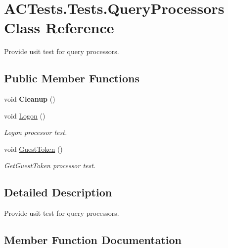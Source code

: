 \hypertarget{class_a_c_tests_1_1_tests_1_1_query_processors}{}\section{A\+C\+Tests.\+Tests.\+Query\+Processors Class Reference}
\label{class_a_c_tests_1_1_tests_1_1_query_processors}


Provide usit test for query processors.  


\subsection*{Public Member Functions}
\begin{DoxyCompactItemize}
\item 
\mbox{\label{class_a_c_tests_1_1_tests_1_1_query_processors_afd4b62ef2a0fdfc623f2102fec22e650}} 
void {\bfseries Cleanup} ()
\item 
void \mbox{\hyperlink{class_a_c_tests_1_1_tests_1_1_query_processors_a52c322106f55712f33a2e1c1273008ad}{Logon}} ()
\begin{DoxyCompactList}\small\item\em Logon processor test. \end{DoxyCompactList}\item 
void \mbox{\hyperlink{class_a_c_tests_1_1_tests_1_1_query_processors_ae80608cafaf625d07d6a27f966fe25fb}{Guest\+Token}} ()
\begin{DoxyCompactList}\small\item\em Get\+Guest\+Token processor test. \end{DoxyCompactList}\end{DoxyCompactItemize}


\subsection{Detailed Description}
Provide usit test for query processors. 



\subsection{Member Function Documentation}
\mbox{\label{class_a_c_tests_1_1_tests_1_1_query_processors_ae80608cafaf625d07d6a27f966fe25fb}} 
